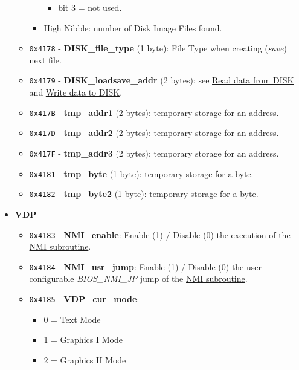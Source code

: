 \begin{itemize}
\begin{itemize}
\begin{itemize}
\begin{itemize}
                        \item bit 3 = not used.
                    \end{itemize}
                    \item High Nibble: number of Disk Image Files found.
                \end{itemize}
                \item \texttt{0x4178} - \textbf{DISK\_file\_type} (1 byte): File
                Type when creating (\textit{save}) next file.
                \item \texttt{0x4179} - \textbf{DISK\_loadsave\_addr} (2 bytes): see
                \hyperref[sec:howto_readdata]{Read data from DISK} and 
                \hyperref[sec:howto_writedata]{Write data to DISK}.
                \item \texttt{0x417B} - \textbf{tmp\_addr1} (2 bytes): temporary
                storage for an address.
                \item \texttt{0x417D} - \textbf{tmp\_addr2} (2 bytes): temporary
                storage for an address.
                \item \texttt{0x417F} - \textbf{tmp\_addr3} (2 bytes): temporary
                storage for an address.
                \item \texttt{0x4181} - \textbf{tmp\_byte} (1 byte): temporary
                storage for a byte.
                \item \texttt{0x4182} - \textbf{tmp\_byte2} (1 byte): temporary
                storage for a byte.
            \end{itemize}
            \item \textbf{VDP}
            \begin{itemize}
                \item \texttt{0x4183} - \textbf{NMI\_enable}: Enable (1) / Disable
                (0) the execution of the \hyperref[sec:nmi]{NMI subroutine}.
                \item \texttt{0x4184} - \textbf{NMI\_usr\_jump}: Enable (1) / Disable
                (0) the user configurable \textit{BIOS\_NMI\_JP} jump of the 
                \hyperref[sec:nmi]{NMI subroutine}.
                \item \texttt{0x4185} - \textbf{VDP\_cur\_mode}:
                \begin{itemize}
                    \item 0 = Text Mode
                    \item 1 = Graphics I Mode
                    \item 2 = Graphics II Mode

\end{itemize}
\end{itemize}
\end{itemize}
